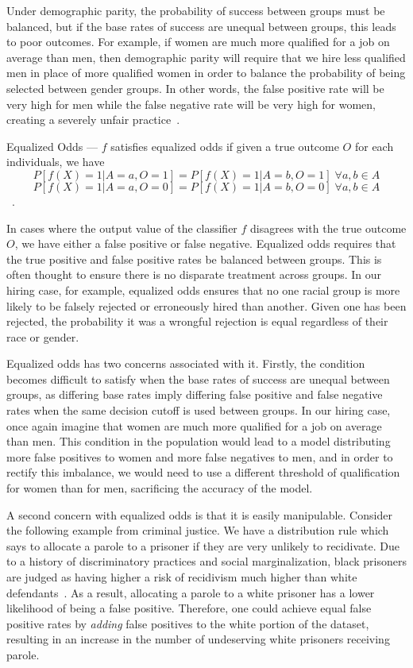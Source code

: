 Under demographic parity, the probability of success between
groups must be balanced, but if the base rates of success are unequal between
groups, this leads to poor outcomes. For example, if women are much more
qualified for a job on average than men, then demographic parity will require
that we hire less qualified men in place of more qualified women in order to
balance the probability of being selected between gender groups. In other words,
the false positive rate will be very high for men while the false negative rate
will be very high for women, creating a severely unfair
practice~\citep{Barocas_2017}.

\begin{definition}
    Equalized Odds — $f$ satisfies equalized odds if given a true outcome $O$
    for each individuals, we have
    \[P[f(X)=1|A=a, O=1] = P[f(X)=1|A=b, O=1]\;\forall a, b\in A\]
    \[P[f(X)=1|A=a, O=0] = P[f(X)=1|A=b, O=0]\;\forall a, b\in A\]~\citep{Hardt_2016}.
\end{definition}

In cases where the output value of the classifier $f$ disagrees with the true
outcome $O$, we have either a false positive or false negative. 
Equalized odds requires that the true positive and false positive rates be
balanced between groups. This is often thought to ensure there is no disparate 
treatment across groups. In our hiring case, for example, equalized odds ensures
that no one racial group is more likely to be falsely rejected or erroneously
hired than another. Given one has been rejected, the probability it was a
wrongful rejection is equal regardless of their race or gender.

Equalized odds has two concerns associated with it. Firstly, the condition
becomes difficult to satisfy when the base rates of success are unequal between
groups, as differing base rates imply differing false positive and false
negative rates when the same decision cutoff is used between groups. In our
hiring case, once again imagine that women are much more qualified for a job on
average than men. This condition in the population would lead to a model
distributing more false positives to women and more false negatives to men, and
in order to rectify this imbalance, we would need to use a different threshold
of qualification for women than for men, sacrificing the accuracy of the model.

A second concern with equalized odds is that it is easily manipulable. Consider
the following example from criminal justice. We have a distribution rule which
says to allocate a parole to a prisoner if they are very unlikely to recidivate.
Due to a history of discriminatory practices and social marginalization, black
prisoners are judged as having higher a risk of recidivism much higher than
white defendants~\citep{CrimeJustice_2023}. As a result, allocating a parole to 
a white prisoner has a lower likelihood of being a false positive. Therefore,
one could achieve equal false positive rates by \textit{adding} false
positives to the white portion of the dataset, resulting in an increase in the
number of undeserving white prisoners receiving parole.

